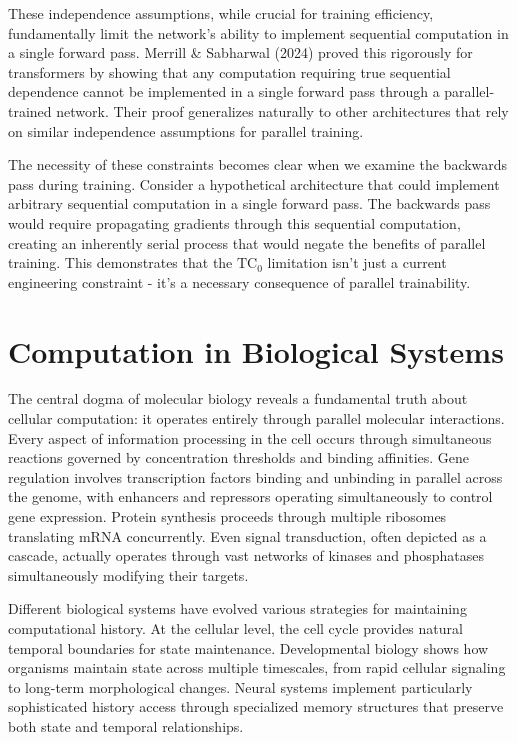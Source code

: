 \documentclass[12pt]{article}
\begin{document}
These independence assumptions, while crucial for training efficiency, fundamentally limit the network's ability to implement sequential computation in a single forward pass. Merrill \& Sabharwal (2024) proved this rigorously for transformers by showing that any computation requiring true sequential dependence cannot be implemented in a single forward pass through a parallel-trained network. Their proof generalizes naturally to other architectures that rely on similar independence assumptions for parallel training.

The necessity of these constraints becomes clear when we examine the backwards pass during training. Consider a hypothetical architecture that could implement arbitrary sequential computation in a single forward pass. The backwards pass would require propagating gradients through this sequential computation, creating an inherently serial process that would negate the benefits of parallel training. This demonstrates that the $\text{TC}_0$ limitation isn't just a current engineering constraint - it's a necessary consequence of parallel trainability.

\section{Computation in Biological Systems}

The central dogma of molecular biology reveals a fundamental truth about cellular computation: it operates entirely through parallel molecular interactions. Every aspect of information processing in the cell occurs through simultaneous reactions governed by concentration thresholds and binding affinities. Gene regulation involves transcription factors binding and unbinding in parallel across the genome, with enhancers and repressors operating simultaneously to control gene expression. Protein synthesis proceeds through multiple ribosomes translating mRNA concurrently. Even signal transduction, often depicted as a cascade, actually operates through vast networks of kinases and phosphatases simultaneously modifying their targets.

Different biological systems have evolved various strategies for maintaining computational history. At the cellular level, the cell cycle provides natural temporal boundaries for state maintenance. Developmental biology shows how organisms maintain state across multiple timescales, from rapid cellular signaling to long-term morphological changes. Neural systems implement particularly sophisticated history access through specialized memory structures that preserve both state and temporal relationships.
\end{document}
